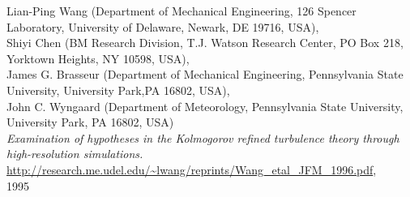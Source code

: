 \documentclass[12pt,a4paper]{article}
\numberwithin{equation}{section}
\begin{document}
\begin{thebibliography}{11}
\begin{en}
  Lian-Ping Wang (Department of Mechanical Engineering, 126 Spencer Laboratory, University of Delaware, Newark, DE 19716, USA),\\
 Shiyi Chen (BM Research Division, T.J. Watson Research Center, PO Box 218, Yorktown Heights,
NY 10598, USA), \\
James G. Brasseur (Department of Mechanical Engineering, Pennsylvania State University, University Park,PA 16802, USA),\\
John C. Wyngaard (Department of Meteorology, Pennsylvania State University, University Park, PA 16802, USA) \\
  \emph{Examination of hypotheses in the Kolmogorov
refined turbulence theory through
high-resolution simulations. }
  \url{http://research.me.udel.edu/~lwang/reprints/Wang_etal_JFM_1996.pdf}, \\
  1995
\end{en}
  
\end{thebibliography}
\end{document}
